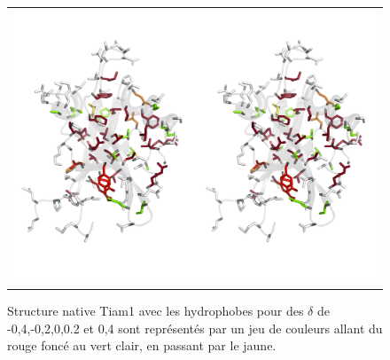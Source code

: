 \begin{landscape}
    \begin{figure}[!htbp]
      \centering
      \caption{\small Structure native Tiam1 avec les hydrophobes pour des $\delta$ de -0,4,-0,2,0,0.2 et 0,4 sont représentés par un jeu de couleurs allant du rouge foncé au vert clair, en passant par le jaune.}

      \begin{tabular}{c}
        \includegraphics[width=20cm]{titration/structure_Tiam1.png} \\
      \end{tabular}
      
      \label{titrationStructTiam1}
    \end{figure}

\end{landscape}

